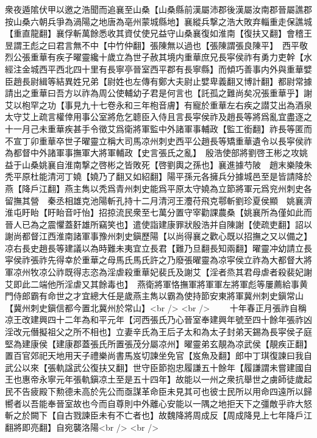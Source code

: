 衆夜遁隂伏甲以邀之浩聞而追襄至山桑【山桑縣前漢屬沛郡後漢屬汝南郡晉屬譙郡按山桑六朝兵爭為渦陽之地唐為亳州蒙城縣地】襄縱兵撃之浩大敗弃輜重走保譙城【重直龍翻】襄俘斬萬餘悉收其資仗使兄益守山桑襄復如淮南【復扶又翻】會稽王昱謂王彪之曰君言無不中【中竹仲翻】張陳無以過也【張陳謂張良陳平】　西平敬烈公張重華有疾子曜靈纔十歲立為世子赦其境内重華庶兄長寜侯祚有勇力吏幹【水經注金城西平西北四十里有長寧亭晉室西平郡有長寧縣】而傾巧善事内外與重華嬖臣趙長尉緝等結異姓兄弟【尉姓也左傳有鄭大夫尉止嬖卑義翻又博計翻】都尉常據請出之重華曰吾方以祚為周公使輔幼子君是何言也【託孤之難尚矣况張重華乎】謝艾以枹罕之功【事見九十七卷永和三年枹音膚】有寵於重華左右疾之譛艾出為酒泉太守艾上疏言權倖用事公室將危乞聼臣入侍且言長寜侯祚及趙長等將爲亂宜盡逐之十一月己未重華疾甚手令徵艾爲衛將軍監中外諸軍事輔政【監工銜翻】祚長等匿而不宣丁卯重華卒世子曜靈立稱大司馬凉州刺史西平公趙長等矯重華遺令以長寜侯祚為都督中外諸軍事撫軍大將軍輔政【史言張氏之亂】　殷浩使部將劉啓王彬之攻姚益于山桑姚襄自淮南撃之啓彬之皆敗死【啓劉輿之孫也】襄進據芍陂　趙末樂陵朱秃平原杜能清河丁嬈【嬈乃了翻又如紹翻】陽平孫元各擁兵分據城邑至是皆請降於燕【降戶江翻】燕主雋以秃爲青州刺史能爲平原太守嬈為立節將軍元爲兖州刺史各留撫其營　秦丞相雄克池陽斬孔持十二月清河王灋苻飛克鄠斬劉珍夏侯顯　姚襄濟淮屯盱眙【盱眙音吁怡】招掠流民衆至七萬分置守宰勸課農桑【姚襄所為僅如此而晉人已為之震懼蓋姧雄所竊笑也】遣使詣建康罪狀殷浩并自陳謝【使疏吏翻】詔以謝尚都督江西淮南諸軍事豫州刺史鎭歷陽【以尚得襄之歡心既以招撫之又以備之】　凉右長史趙長等建議以為時難未夷宜立長君【難乃旦翻長知兩翻】曜靈冲幼請立長寜侯祚張祚先得幸於重華之母馬氏馬氏許之乃廢張曜靈為凉寜侯立祚為大都督大將軍凉州牧凉公祚既得志恣為淫虐殺重華妃裴氏及謝艾【淫者烝其君母虐者殺裴妃謝艾即此二端他所淫虐又其餘毒也】　燕衛將軍恪撫軍將軍軍左將軍彪等屢薦給事黄門侍郎霸有命世之才宜總大任是歲燕主雋以霸為使持節安東將軍冀州刺史鎭常山【冀州刺史鎭信都今置北冀州於常山】<br />
<br />
　　十年春正月張祚自稱凉王改建興四十二年為和平元年【河西張氏乃心晉室奉建興年號至四十餘年張祚凶淫改元僭擬祖父之所不相也】立妻辛氏為王后子太和為太子封弟天錫為長寜侯子庭堅為建康侯【建康郡蓋張氏所置張茂分屬凉州】曜靈弟玄靚為凉武侯【靚疾正翻】置百官郊祀天地用天子禮樂尚書馬岌切諫坐免官【岌魚及翻】郎中丁琪復諫曰我自武公以來【張軌諡武公復扶又翻】世守臣節抱忠履謙五十餘年【履謙謂未嘗建國自王也惠帝永寧元年張軌鎭凉土至是五十四年】故能以一州之衆抗舉世之虜師徒歲起民不告疲殿下勲德未高於先公而亟謀革命臣未見其可也彼士民所以用命四遠所以歸嚮者以吾能奉晉室故也今而自尊則中外離心安能以一隅之地拒天下之彊敵乎祚大怒斬之於闕下【自古戮諫臣未有不亡者也】故魏降將周成反【周成降見上七年降戶江翻將即亮翻】自宛襲洛陽<br />
<br />
